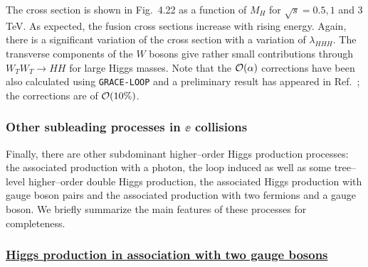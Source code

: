 {\begin{figure}[!h]
\begin{center}
\vspace*{-1.cm}
\hspace*{-1.cm}
\end{center}
\vspace*{-15.5cm}
\vspace*{-.1cm}
\end{figure}


The cross section is shown in Fig.~4.22 as a function of $M_H$ for $\sqrt{s}
=0.5,1$ and 3 TeV. As expected, the fusion cross sections increase with rising
energy.  Again, there is a significant variation of the cross section with a
variation of $\lambda_{HHH}$. The transverse components of the $W$ bosons give
rather small contributions through $W_T W_T \to HH$ for large Higgs masses.
Note that the ${\cal O}(\alpha)$ corrections have been also calculated using
{\tt GRACE-LOOP} and a preliminary result has appeared in Ref.~\cite{RCZZ}; the
corrections are of ${\cal O}(10\%)$.  


\subsubsection{Other subleading processes in $\ee$ collisions} 

Finally, there are other subdominant higher--order Higgs production processes:
the associated production with a photon, the loop induced as well as some 
tree--level higher--order double Higgs production, the associated Higgs 
production with gauge boson pairs and the associated production with two 
fermions and a gauge boson.  We briefly summarize the main features of 
these processes for completeness.

\vspace*{-2mm}
\subsubsection*{\underline{Higgs production in association with two gauge 
bosons}}

}
